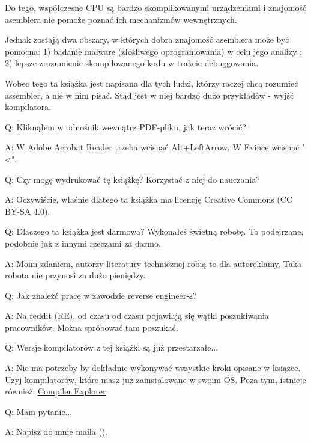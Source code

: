Do tego, współczesne \ac{CPU} są bardzo skomplikowanymi urządzeniami i znajomość asemblera nie pomoże poznać ich mechanizmów wewnętrznych.

Jednak zostają dwa obszary, w których dobra znajomość asemblera może być pomocna:
1) badanie malware (złośliwego oprogramowania) w celu jego analizy ; 2) lepsze zrozumienie skompilowanego kodu w trakcie debuggowania.

Wobec tego ta książka jest napisana dla tych ludzi, którzy raczej chcą rozumieć assembler, a nie w nim pisać. Stąd jest w niej bardzo dużo przykładów - wyjść kompilatora.

\par Q: Kliknąłem w odnośnik wewnątrz PDF-pliku, jak teraz wrócić?
\par A: W Adobe Acrobat Reader trzeba wcisnąć Alt+LeftArrow. W Evince wcisnąć "<".

\par Q: Czy mogę wydrukować tę książkę? Korzystać z niej do nauczania?
\par A: Oczywiście, właśnie dlatego ta książka ma licencję Creative Commons (CC BY-SA 4.0).

\par Q: Dlaczego ta książka jest darmowa? Wykonałeś świetną robotę. To podejrzane, podobnie jak z innymi rzeczami za darmo.
\par A: Moim zdaniem, autorzy literatury technicznej robią to dla autoreklamy. Taka robota nie przynosi za dużo pieniędzy.

\par Q: Jak znaleźć pracę w zawodzie reverse engineer-а?
\par A: Na reddit (RE\FNURLREDDIT), od czasu od czasu pojawiają się wątki poszukiwania pracowników.
Można spróbować tam poszukać.


\par Q: Wersje kompilatorów z tej książki są już przestarzałe...
\par A: Nie ma potrzeby by dokładnie wykonywać wszystkie kroki opisane w książce.
Użyj kompilatorów, które masz już zainstalowane w swoim \ac{OS}.
Poza tym, istnieje również: \href{https://godbolt.org/}{Compiler Explorer}.

\par Q: Mam pytanie...
\par A: Napisz do mnie maila (\EMAILS).

